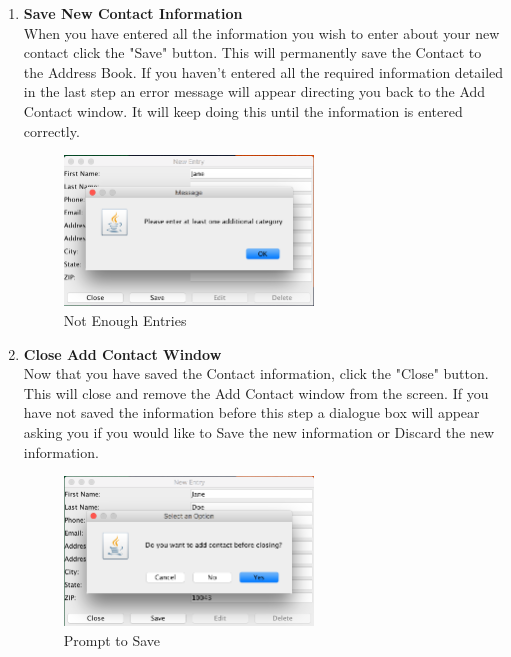 \documentclass[a4paper, 11pt]{article}
\begin{document}
\begin{enumerate}[label=\textbf{\arabic*})]
    \clearpage
    
    \item{\textbf{Save New Contact Information}}\\ When you have entered all the information you wish to enter about your new contact click the "Save" button. This will permanently save the Contact to the Address Book. If you haven't entered all the required information detailed in the last step an error message will appear directing you back to the Add Contact window. It will keep doing this until the information is entered correctly.
    
    \begin{figure}[h!]
    \centering
      \includegraphics[width=250]{add_entry_error.png}
      \caption{Not Enough Entries}
    \end{figure}
    
    \item{\textbf{Close Add Contact Window}}\\ Now that you have saved the Contact information, click the "Close" button. This will close and remove the Add Contact window from the screen. If you have not saved the information before this step a dialogue box will appear asking you if you would like to Save the new information or Discard the new information.
    
    \begin{figure}[h!]
    \centering
      \includegraphics[width=250]{add_entry_save_error.png}
      \caption{Prompt to Save}
    \end{figure}
    

\end{enumerate}
\end{document}
